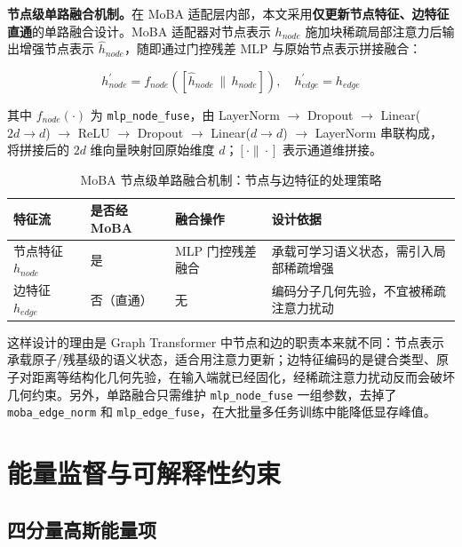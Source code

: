 \textbf{节点级单路融合机制。}在 MoBA 适配层内部，本文采用\textbf{仅更新节点特征、边特征直通}的单路融合设计。MoBA 适配器对节点表示 $h_{node}$ 施加块稀疏局部注意力后输出增强节点表示 $\hat{h}_{node}$，随即通过门控残差 MLP 与原始节点表示拼接融合：

\begin{equation}
h_{node}^{\prime} = f_{node}\!\left(\left[\hat{h}_{node} \,\|\, h_{node}\right]\right), \quad h_{edge}^{\prime} = h_{edge}
\label{eq:moba_node_fuse}
\end{equation}

其中 $f_{node}(\cdot)$ 为 \texttt{mlp\_node\_fuse}，由 LayerNorm $\rightarrow$ Dropout $\rightarrow$ Linear($2d \to d$) $\rightarrow$ ReLU $\rightarrow$ Dropout $\rightarrow$ Linear($d \to d$) $\rightarrow$ LayerNorm 串联构成，将拼接后的 $2d$ 维向量映射回原始维度 $d$；$[\cdot \| \cdot]$ 表示通道维拼接。

\begin{table}[htb]
  \centering
  \caption{MoBA 节点级单路融合机制：节点与边特征的处理策略}
  \label{T.moba_fusion}
  \small
  \begin{tabular}{p{2.8cm}p{2.2cm}p{3.0cm}p{3.6cm}}
    \toprule
    特征流 & 是否经 MoBA & 融合操作 & 设计依据 \\
    \midrule
    节点特征 $h_{node}$ & 是 & MLP 门控残差融合 & 承载可学习语义状态，需引入局部稀疏增强 \\
    边特征 $h_{edge}$ & 否（直通） & 无 & 编码分子几何先验，不宜被稀疏注意力扰动 \\
    \bottomrule
  \end{tabular}
\end{table}

这样设计的理由是 Graph Transformer 中节点和边的职责本来就不同\cite{ying2021transformers}：节点表示承载原子/残基级的语义状态，适合用注意力更新；边特征编码的是键合类型、原子对距离等结构化几何先验，在输入端就已经固化，经稀疏注意力扰动反而会破坏几何约束\cite{lai2024interformer}。另外，单路融合只需维护 \texttt{mlp\_node\_fuse} 一组参数，去掉了 \texttt{moba\_edge\_norm} 和 \texttt{mlp\_edge\_fuse}，在大批量多任务训练中能降低显存峰值。

\newpage

\section{能量监督与可解释性约束}
\subsection{四分量高斯能量项}

